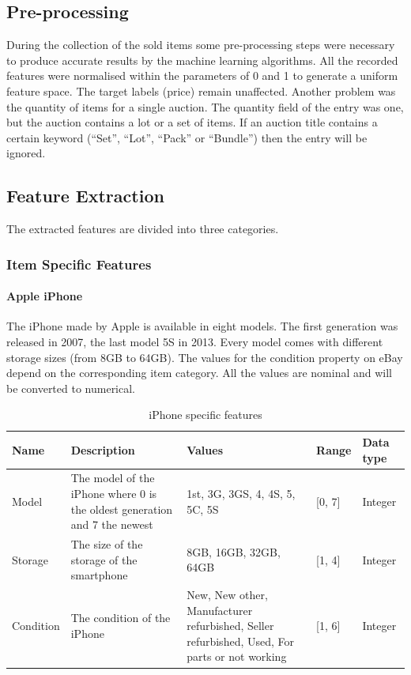 \subsection{Pre-processing}
During the collection of the sold items some pre-processing steps were necessary to produce accurate results by the machine learning algorithms. All the recorded features were normalised within the parameters of 0 and 1 to generate a uniform feature space. The target labels (price) remain unaffected. 
Another problem was the quantity of items for a single auction. The quantity field of the entry was one, but the auction contains a lot or a set of items. If an auction title contains a certain keyword (``Set'', ``Lot'', ``Pack'' or ``Bundle'') then the entry will be ignored.
\subsection{Feature Extraction}
The extracted features are divided into three categories.
\subsubsection{Item Specific Features}
\paragraph{Apple iPhone}
The iPhone made by Apple is available in eight models. The first generation was released in 2007, the last model 5S in 2013. Every model comes with different storage sizes (from 8GB to 64GB). The values for the condition property on eBay depend on the corresponding item category. All the values are nominal and will be converted to numerical.
\begin{table}[h!]
	\begin{center}
	\begin{tabular}{| p{2.6cm} | p{2.6cm} | p{2.6cm} | p{2.6cm} | p{2.6cm} |}
		\hline
		\textbf{Name} & \textbf{Description} & \textbf{Values} & \textbf{Range} & \textbf{Data type} \\
		\hline
		Model & The model of the iPhone where 0 is the oldest generation and 7 the newest & 1st, 3G, 3GS, 4, 4S, 5, 5C, 5S & [0, 7] & Integer \\
		\hline
		Storage & The size of the storage of the smartphone & 8GB, 16GB, 32GB, 64GB & [1, 4] & Integer \\
		\hline
		Condition & The condition of the iPhone & New, New other, Manufacturer refurbished, Seller refurbished, Used, For parts or not working & [1, 6] & Integer \\
		\hline
	\end{tabular}
	\end{center}
	\caption{iPhone specific features}
\end{table}


